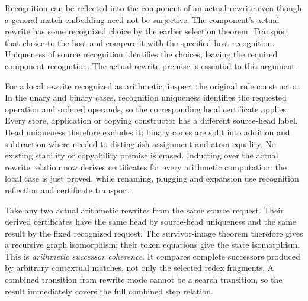 




Recognition can be reflected into the component of an actual rewrite even
though a general match embedding need not be surjective. The component's actual
rewrite has some recognized choice by the earlier selection theorem. Transport
that choice to the host and compare it with the specified host recognition.
Uniqueness of source recognition identifies the choices, leaving the required
component recognition. The actual-rewrite premise is essential to this argument.


For a local rewrite recognized as arithmetic, inspect the original rule
constructor. In the unary and binary cases, recognition uniqueness identifies
the requested operation and ordered operands, so the corresponding local
certificate applies. Every store, application or copying constructor has a
different source-head label. Head uniqueness therefore excludes it; binary
codes are split into addition and subtraction where needed to distinguish
assignment and atom equality. No existing stability or copyability premise is
erased. Inducting over the actual rewrite relation now derives certificates
for every arithmetic computation: the local case is just proved, while renaming,
plugging and expansion use recognition reflection and certificate transport.



Take any two actual arithmetic rewrites from the same source request. Their
derived certificates have the same head by source-head uniqueness and the same
result by the fixed recognized request. The survivor-image theorem therefore
gives a recursive graph isomorphism; their token equations give the state
isomorphism. This is \emph{arithmetic successor coherence}. It compares complete
successors produced by arbitrary contextual matches, not only the selected
redex fragments. A combined transition from rewrite mode cannot be a search
transition, so the result immediately covers the full combined step relation.

